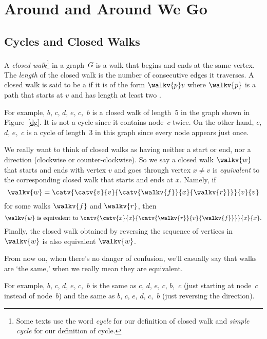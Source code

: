 \section{Around and Around We Go}

\subsection{Cycles and Closed Walks}

\begin{definition}
  A \emph{closed walk}\footnote{Some texts use the word \emph{cycle} for
    our definition of closed walk and \emph{simple cycle} for our
    definition of cycle.} in a graph~$G$ is a walk that begins and ends at
  the same vertex.  The \emph{length} of the closed walk is the number of
  consecutive edges it traverses.  A closed walk is said to be
  a  if it is of the form $\walkv{p}v$ where $\walkv{p}$ is a
  path that starts at $v$ and has length at least two .
\end{definition}

For example, $b$, $c$, $d$, $e$, $c$,~$b$ is a closed walk of
length~5 in the graph shown in Figure~\ref{dg}.  It is not a cycle
since it contains node~$c$ twice.  On the other hand, $c$, $d$,
$e$,~$c$ is a cycle of length~3 in this graph since every node
appears just once.

\begin{editingnotes}
\end{editingnotes}

We really want to think of closed walks as having neither a start or end,
nor a direction (clockwise or counter-clockwise).  So we say a closed walk
$\walkv{w}$ that starts and ends with vertex $v$ and goes through vertex
$x \neq v$ is \emph{equivalent} to the corresponding closed walk that
starts and ends at $x$.  Namely, if
\[
\walkv{w} = \catv{\catv{v}{v}{\catv{\walkv{f}}{x}{\walkv{r}}}}{v}{v}
\]
for some walks $\walkv{f}$ and $\walkv{r}$, then
\[
\walkv{w} \text{ is equivalent to }
\catv{\catv{x}{x}{\catv{\walkv{r}}{v}{\walkv{f}}}}{x}{x}.
\]
Finally, the closed walk obtained by reversing the sequence of vertices in
$\walkv{w}$ is also equivalent $\walkv{w}$.

From now on, when there's no danger of confusion, we'll casually say
that walks are `the same,' when we really mean they are equivalent.

For example, $b$, $c$, $d$, $e$, $c$,~$b$ is the same as $c$, $d$,
$e$, $c$, $b$,~$c$ (just starting at node~$c$ instead of node~$b$) and
the same as $b$, $c$, $e$, $d$, $c$,~$b$ (just reversing the
direction).

